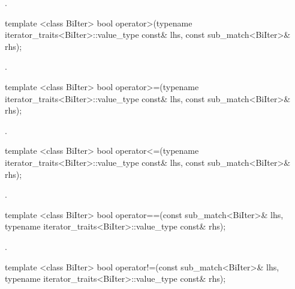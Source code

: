 \begin{itemdescr}
\pnum
\returns {}.
\end{itemdescr}

%
\begin{itemdecl}
template <class BiIter> 
  bool operator>(typename iterator_traits<BiIter>::value_type const& lhs, 
                 const sub_match<BiIter>& rhs); 
\end{itemdecl}

\begin{itemdescr}
\pnum
\returns {}.
\end{itemdescr}

%
\begin{itemdecl}
template <class BiIter> 
  bool operator>=(typename iterator_traits<BiIter>::value_type const& lhs, 
                  const sub_match<BiIter>& rhs); 
\end{itemdecl}

\begin{itemdescr}
\pnum
\returns {}.
\end{itemdescr}

%
\begin{itemdecl}
template <class BiIter> 
  bool operator<=(typename iterator_traits<BiIter>::value_type const& lhs, 
                  const sub_match<BiIter>& rhs); 
\end{itemdecl}

\begin{itemdescr}
\pnum
\returns {}.
\end{itemdescr}

%
\begin{itemdecl}
template <class BiIter> 
  bool operator==(const sub_match<BiIter>& lhs, 
                  typename iterator_traits<BiIter>::value_type const& rhs); 
\end{itemdecl}

\begin{itemdescr}
\pnum
\returns {}.
\end{itemdescr}

%
\begin{itemdecl}
template <class BiIter> 
  bool operator!=(const sub_match<BiIter>& lhs, 
                  typename iterator_traits<BiIter>::value_type const& rhs); 
\end{itemdecl}

